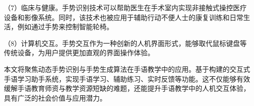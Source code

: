 （7）临床与健康。手势识别技术可以帮助医生在手术室内实现非接触式操控医疗设备和影像系统\cite{strickland2013using}。同时，该技术也被应用于辅助行动不便人士的康复训练和日常生活，例如通过手势来控制智能轮椅\cite{zeng2012natural}。

（8）计算机交互。手势交互作为一种创新的人机界面形式，能够取代鼠标键盘等传统设备，为用户提供更加直观的界面操作体验\cite{starner1998real}。

本文将聚焦动态手势识别与手势生成算法在手语教学中的应用。基于构建的交互式手语学习助手系统，实现手语学习、辅助练习、实时反馈等功能。这不仅能够有效缓解手语教育师资与教学资源短缺的难题，还能提升手语教学中的人机交互体验，具有广泛的社会价值与应用潜力。



